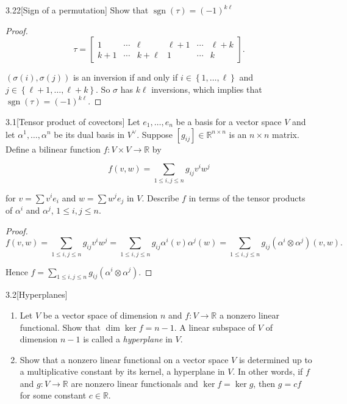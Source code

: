 \begin{exercise}{3.22}[Sign of a permutation]
	Show that \( \operatorname{sgn}(\tau) = {(-1)}^{k\ell} \)
\end{exercise}

\begin{proof}
	\[
		\tau = \begin{bmatrix}
			1     & \cdots & \ell     & \ell + 1 & \cdots & \ell + k \\
			k + 1 & \cdots & k + \ell & 1        & \cdots & k
		\end{bmatrix}.
	\]

	\( (\sigma(i), \sigma(j)) \) is an inversion if and only if \( i \in \left\{ 1, \ldots, \ell \right\} \) and \( j \in \left\{ \ell + 1, \ldots, \ell + k \right\} \). So \( \sigma \) has \( k\ell \) inversions, which implies that \( \operatorname{sgn}(\tau) = {(-1)}^{k\ell} \).
\end{proof}

\begin{problem}{3.1}[Tensor product of covectors]
Let \( e_{1}, \ldots, e_{n} \) be a basis for a vector space \( V \) and let \( \alpha^{1}, \ldots, \alpha^{n} \) be its dual basis in \( V^{\vee} \). Suppose \( [g_{ij}] \in \mathbb{R}^{n \times n} \) is an \( n \times n \) matrix. Define a bilinear function \( f \colon V \times V \to \mathbb{R} \) by

\[
	f(v, w) = \sum_{1 \leq i, j \leq n} g_{ij} v^{i} w^{j}
\]

for \( v = \sum v^{i} e_{i} \) and \( w = \sum w^{j} e_{j} \) in \( V \). Describe \( f \) in terms of the tensor products of \( \alpha^{i} \) and \( \alpha^{j} \), \( 1 \leq i, j \leq n \).
\end{problem}

\begin{proof}
	\[
		f(v, w) = \sum_{1\leq i, j\leq n} g_{ij}v^{i}w^{j} = \sum_{1\leq i, j\leq n} g_{ij} \alpha^{i}(v)\alpha^{j}(w) = \sum_{1\leq i, j\leq n} g_{ij} (\alpha^{i}\otimes \alpha^{j})(v, w).
	\]

	Hence \( f = \sum_{1\leq i, j \leq n} g_{ij} (\alpha^{i} \otimes \alpha^{j}) \).
\end{proof}

\begin{problem}{3.2}[Hyperplanes]
\begin{enumerate}[label={(\alph*)},itemsep=0pt]
	\item Let \( V \) be a vector space of dimension \( n \) and \( f \colon V \to \mathbb{R} \) a nonzero linear functional. Show that \( \dim \ker f = n - 1 \). A linear subspace of \( V \) of dimension \( n - 1 \) is called a \textit{hyperplane} in \( V \).
	\item Show that a nonzero linear functional on a vector space \( V \) is determined up to a multiplicative constant by its kernel, a hyperplane in \( V \). In other words, if \( f \) and \( g \colon V \to \mathbb{R} \) are nonzero linear functionals and \( \ker f = \ker g \), then \( g = c f \) for some constant \( c \in \mathbb{R} \).
\end{enumerate}
\end{problem}

